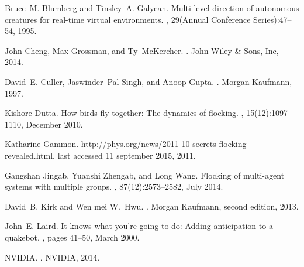 \documentclass[journal,transmag]{IEEEtran}
\begin{document}
%
%
%
\begin{thebibliography}{1}

Bruce~M. Blumberg and Tinsley~A. Galyean.
\newblock Multi-level direction of autonomous creatures for real-time virtual
  environments.
, 29(Annual Conference Series):47--54, 1995.

John Cheng, Max Grossman, and Ty~McKercher.
.
\newblock John Wiley \& Sons, Inc, 2014.

David~E. Culler, Jaswinder~Pal Singh, and Anoop Gupta.
.
\newblock Morgan Kaufmann, 1997.

Kishore Dutta.
\newblock How birds fly together: The dynamics of flocking.
, 15(12):1097--1110, December 2010.

Katharine Gammon.
\newblock http://phys.org/news/2011-10-secrets-flocking-revealed.html, last
  accessed 11 september 2015, 2011.

Gangshan Jingab, Yuanshi Zhengab, and Long Wang.
\newblock Flocking of multi-agent systems with multiple groups.
, 87(12):2573–2582, July
  2014.

David~B. Kirk and Wen mei W.~Hwu.
.
\newblock Morgan Kaufmann, second edition, 2013.

John~E. Laird.
\newblock It knows what you're going to do: Adding anticipation to a quakebot.
, pages 41--50, March 2000.

NVIDIA.
.
\newblock NVIDIA, 2014.


\end{thebibliography}
\end{document}
